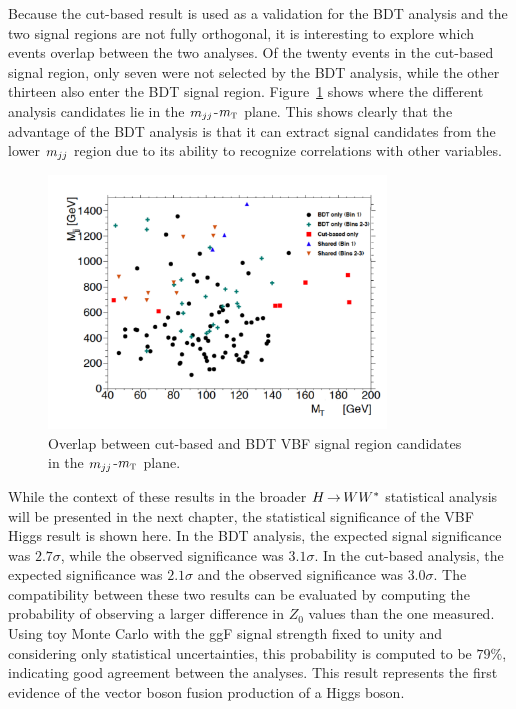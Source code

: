 Because the cut-based result is used as a validation for the BDT analysis and the two signal regions are not fully orthogonal, it is interesting to explore which events overlap between the two analyses. Of the twenty events in the cut-based signal region, only seven were not selected by the BDT analysis, while the other thirteen also enter the BDT signal region. Figure~\ref{fig:vbf_bdt_cb_overlay} shows where the different analysis candidates lie in the $m_{jj}$-$m_{\textrm{\footnotesize\sc t}}$ plane. This shows clearly that the advantage of the BDT analysis is that it can extract signal candidates from the lower $m_{jj}$ region due to its ability to recognize correlations with other variables. 

\begin{figure}[h!]
  \centering
  \captionsetup{justification=centering}
  \includegraphics[width=0.8\textwidth]{figures/OverlapFig}
  \caption{Overlap between cut-based and BDT VBF signal region candidates in the $m_{jj}$-$m_{\textrm{\footnotesize\sc t}}$ plane.}
  \label{fig:vbf_bdt_cb_overlay}
\end{figure}

While the context of these results in the broader $H{\,{\rightarrow}\,}WW^\ast$ statistical analysis will be presented in the next chapter, the statistical significance of the VBF Higgs result is shown here. In the BDT analysis, the expected signal significance was $2.7\sigma$, while the observed significance was $3.1\sigma$. In the cut-based analysis, the expected significance was $2.1\sigma$ and the observed significance was $3.0\sigma$. The compatibility between these two results can be evaluated by computing the probability of observing a larger difference in $Z_0$ values than the one measured. Using toy Monte Carlo with the ggF signal strength fixed to unity and considering only statistical uncertainties, this probability is computed to be $79\%$, indicating good agreement between the analyses. This result represents the first evidence of the vector boson fusion production of a Higgs boson. 
